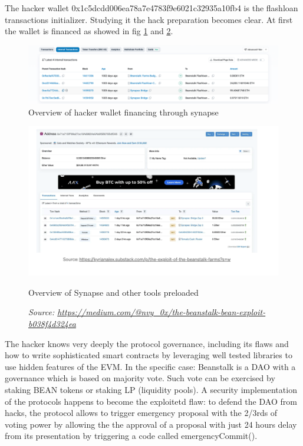 \documentclass[11pt,a4paper,titlepage]{scrartcl}
\begin{document}
The hacker wallet 0x1c5dcdd006ea78a7e4783f9e6021c32935a10fb4 is the flashloan transactions initializer. Studying it the hack preparation becomes clear. At first the wallet is financed as showed in fig  \ref{fig:beanstalk2} and  \ref{fig:beanstalk3}.
\begin{figure}[ht]
    \centering %
    \includegraphics[width=\textwidth, keepaspectratio]{image/beanstalk/etherscan_fin_wallet.png}
    \caption{Overview of hacker wallet financing through synapse}
    \label{fig:beanstalk2}
\end{figure}


\begin{figure}[ht]
    \centering %
    \includegraphics[width=\textwidth, keepaspectratio]{image/beanstalk/hackerfinancingWallet.png}
    \caption{Overview of Synapse and other tools preloaded }
    \caption*{\footnotesize \textit{Source: \url{https://medium.com/@nvy_0x/the-beanstalk-bean-exploit-b038f4d324ea}}}
    \label{fig:beanstalk3}
\end{figure}





The hacker knows very deeply the protocol governance, including its flaws and how to write sophisticated smart contracts by leveraging well tested libraries to use hidden features of the EVM.
In the specific case: Beanstalk is a DAO with a governance which is based on majority vote. Such vote can be exercised by staking BEAN tokens or staking LP (liquidity pools). A security implementation of the protocols happens to become the exploitetd flaw: to defend the DAO from hacks, the protocol allows to trigger emergency proposal with the 2/3rds of voting power by allowing the the approval of a proposal with just 24 hours delay from its presentation by triggering a code called emergencyCommit().
\end{document}
